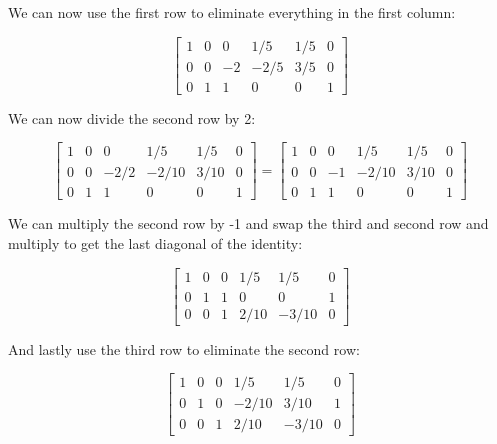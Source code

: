 \documentclass[12pt,letterpaper]{article}
\begin{document}
We can now use the first row to eliminate everything in the first column:

\begin{equation}
    \left[\begin{array}{ccc|ccc}
    1   & 0     &  0    & 1/5   & 1/5   & 0 \\
    0   & 0     & -2    & -2/5  & 3/5   & 0 \\
    0   & 1     &  1    & 0     & 0     & 1
    \end{array}\right]
\end{equation}

\newpage

We can now divide the second row by 2:

\begin{equation}
    \left[\begin{array}{ccc|ccc}
    1   & 0     &  0    & 1/5   & 1/5   & 0 \\
    0   & 0     & -2/2  & -2/10 & 3/10  & 0 \\
    0   & 1     &  1    & 0     & 0     & 1
    \end{array}\right]
    =
    \left[\begin{array}{ccc|ccc}
    1   & 0     &  0    & 1/5   & 1/5   & 0 \\
    0   & 0     & -1    & -2/10 & 3/10  & 0 \\
    0   & 1     &  1    & 0     & 0     & 1
    \end{array}\right]
\end{equation}

We can multiply the second row by -1 and swap the third and second row and multiply to get the last diagonal of the identity:

\begin{equation}
    \left[\begin{array}{ccc|ccc}
    1   & 0     &  0    & 1/5   & 1/5   & 0 \\
    0   & 1     &  1    & 0     & 0     & 1 \\
    0   & 0     &  1    & 2/10  & -3/10 & 0
    \end{array}\right]
\end{equation}

And lastly use the third row to eliminate the second row:

\begin{equation}
    \left[\begin{array}{ccc|ccc}
    1   & 0     &  0    & 1/5   & 1/5   & 0 \\
    0   & 1     &  0    & -2/10 & 3/10  & 1 \\
    0   & 0     &  1    & 2/10  & -3/10 & 0
    \end{array}\right]
\end{equation}
\end{document}
